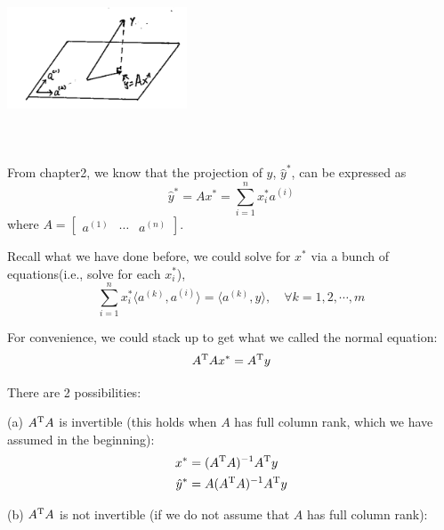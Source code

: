 \begin{marginfigure}
	\centering
	\includegraphics[width=2.1in,height=2.1in]{figures/ch06/figure1.png}
\end{marginfigure}

From chapter2, we know that the projection of $y$, $\hat{y}^*$, can be expressed as
\begin{equation*}
\hat{y}^* = Ax^*= \sum^n_{i=1}x_i^*a^{(i)}
\end{equation*}
where 
$A =   
\left[
\begin{matrix}
a^{(1)} & \cdots & a^{(n)}
\end{matrix}
\right]
$.

Recall what we have done before, we could solve for $x^*$ via a bunch of equations(i.e., solve for each $x_i^*$),
\begin{equation*}
\sum^n_{i=1}x_i^*\langle a^{(k)}, a^{(i)}\rangle = \langle a^{(k)}, y\rangle, \quad \forall k= 1,2,\cdots,m
\end{equation*}

For convenience, we could stack up to get what we called the normal equation:
\begin{equation*}
A^{{\rm T}}Ax^* = A^{{\rm T}}y
\end{equation*}

There are 2 possibilities: 

(a) $A^{{\rm T}}A$ is invertible (this holds when $A$ has full column rank, which we have assumed in the beginning):
\begin{align*}
x^* &= (A^{{\rm T}}A)^{-1}A^{{\rm T}}y\\
\hat{y}^* &= A(A^{{\rm T}}A)^{-1}A^{{\rm T}}y
\end{align*}


(b) $A^{{\rm T}}A$ is not invertible (if we do not assume that $A$ has full column rank):

